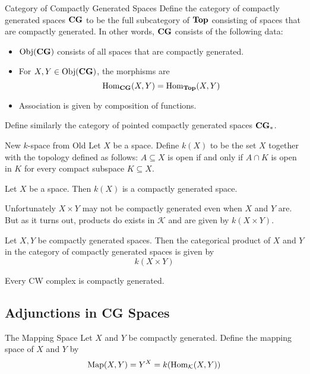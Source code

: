 \documentclass[a4paper]{article}
\begin{document}
\begin{defn}{Category of Compactly Generated Spaces}{} Define the category of compactly generated spaces $\bold{CG}$ to be the full subcategory of $\bold{Top}$ consisting of spaces that are compactly generated. In other words, $\bold{CG}$ consists of the following data: 
\begin{itemize}
\item $\text{Obj}(\bold{CG})$ consists of all spaces that are compactly generated. 
\item For $X,Y\in\text{Obj}(\bold{CG})$, the morphisms are $$\operatorname{Hom}_{\bold{CG}}(X,Y)=\operatorname{Hom}_{\bold{Top}}(X,Y)$$
\item Association is given by composition of functions. 
\end{itemize}
Define similarly the category of pointed compactly generated spaces $\bold{CG}_\ast$. 
\end{defn}

\begin{defn}{New $k$-space from Old}{} Let $X$ be a space. Define $k(X)$ to be the set $X$ together with the topology defined as follows: $A\subseteq X$ is open if and only if $A\cap K$ is open in $K$ for every compact subspace $K\subseteq X$. 
\end{defn}

\begin{lmm}{}{} Let $X$ be a space. Then $k(X)$ is a compactly generated space. 
\end{lmm}

Unfortunately $X\times Y$ may not be compactly generated even when $X$ and $Y$ are. But as it turns out, products do exists in $\mathcal{K}$ and are given by $k(X\times Y)$. 

\begin{prp}{}{} Let $X,Y$ be compactly generated spaces. Then the categorical product of $X$ and $Y$ in the category of compactly generated spaces is given by $$k(X\times Y)$$
\end{prp}

\begin{prp}{}{} Every CW complex is compactly generated. 
\end{prp}

\subsection{Adjunctions in CG Spaces}
\begin{defn}{The Mapping Space}{} Let $X$ and $Y$ be compactly generated. Define the mapping space of $X$ and $Y$ by $$\text{Map}(X,Y)=Y^X=k(\operatorname{Hom}_{\mathcal{K}}(X,Y))$$
\end{defn}
\end{document}
